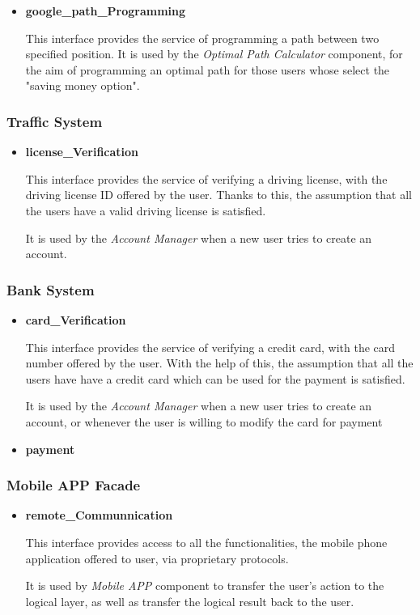 \documentclass[a4paper,11pt]{article}
\begin{document}
\begin{itemize}
				\item \textbf{google\_path\_Programming}	

This interface provides the service of programming a path between two specified position.			
It is used by the \textsl{Optimal Path Calculator} component, for the aim of programming an optimal path for those users whose select the "saving money option".
			\end{itemize}
			
		\subsubsection{Traffic System}
			\begin{itemize}
				\item \textbf{license\_Verification}

This interface provides the service of verifying a driving license, with the driving license ID offered by the user. Thanks to this, the assumption that all the users have a valid driving license is satisfied. 

It is used by the \textsl{Account Manager} when a new user tries to create an account.
			\end{itemize}
			
		\subsubsection{Bank System}
			\begin{itemize}
				\item \textbf{card\_Verification}

This interface provides the service of verifying a credit card, with the card number offered by the user. With the help of this, the assumption that all the users have have a credit card which can be used for the payment is satisfied.

It is used by the \textsl{Account Manager} when a new user tries to create an account, or whenever the user is willing to modify the card for payment
				\item \textbf{payment}
			\end{itemize}
	
		\subsubsection{Mobile APP Facade}
			\begin{itemize}
				\item \textbf{remote\_Communnication}

This interface provides access to all the functionalities, the mobile phone application offered to user, via proprietary protocols.

It is used by \textsl{Mobile APP} component to transfer the user's action to the logical layer, as well as transfer the logical result back to the user. 					
			\end{itemize}
			
\end{document}
